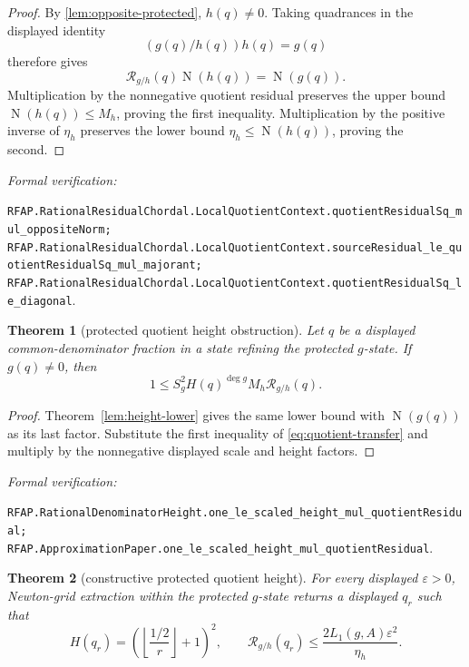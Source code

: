 \documentclass[11pt]{article}
\newtheorem{theorem}{Theorem}[section]
\newcommand{\Norm}[1]{\operatorname{N}\!\left(#1\right)}
\newcommand{\eps}{\varepsilon}
\newcommand{\leanref}[1]{\par\smallskip\noindent
  \emph{Formal verification:}\par\nobreak
  {\raggedright\nolinkurl{#1}.\par}}
\begin{document}
\begin{proof}
By \cref{lem:opposite-protected}, $h(q)\ne0$.  Taking quadrances in the
displayed identity
\[
                        (g(q)/h(q))h(q)=g(q)
\]
therefore gives
\[
       \mathcal R_{g/h}(q)\Norm{h(q)}=\Norm{g(q)}.
\]
Multiplication by the nonnegative quotient residual preserves the upper
bound $\Norm{h(q)}\le M_h$, proving the first inequality.  Multiplication by
the positive inverse of $\eta_h$ preserves the lower bound
$\eta_h\le\Norm{h(q)}$, proving the second.
\end{proof}

\leanref{RFAP.RationalResidualChordal.LocalQuotientContext.quotientResidualSq_mul_oppositeNorm;
RFAP.RationalResidualChordal.LocalQuotientContext.sourceResidual_le_quotientResidualSq_mul_majorant;
RFAP.RationalResidualChordal.LocalQuotientContext.quotientResidualSq_le_diagonal}

\begin{theorem}[protected quotient height obstruction]
\label{thm:quotient-height-lower}
Let $q$ be a displayed common-denominator fraction in a state refining the
protected $g$-state.  If $g(q)\ne0$, then
\begin{equation}
\label{eq:quotient-lower}
  1\le S_g^2H(q)^{\deg g}M_h\mathcal R_{g/h}(q).
\end{equation}
\end{theorem}

\begin{proof}
Theorem~\ref{lem:height-lower} gives the same lower bound with
$\Norm{g(q)}$ as its last factor.  Substitute the first inequality of
\eqref{eq:quotient-transfer} and multiply by the nonnegative displayed scale
and height factors.
\end{proof}

\leanref{RFAP.RationalDenominatorHeight.one_le_scaled_height_mul_quotientResidual;
RFAP.ApproximationPaper.one_le_scaled_height_mul_quotientResidual}

\begin{theorem}[constructive protected quotient height]
\label{thm:quotient-height-upper}
For every displayed $\eps>0$, Newton-grid extraction within the protected
$g$-state returns a displayed $q_r$ such that
\begin{equation}
\label{eq:quotient-upper}
 H(q_r)=\left(\left\lfloor\frac{1/2}{r}\right\rfloor+1\right)^2,
 \qquad
 \mathcal R_{g/h}(q_r)
 \le\frac{2L_1(g,A)\eps^2}{\eta_h}.
\end{equation}
\end{theorem}
\end{document}
